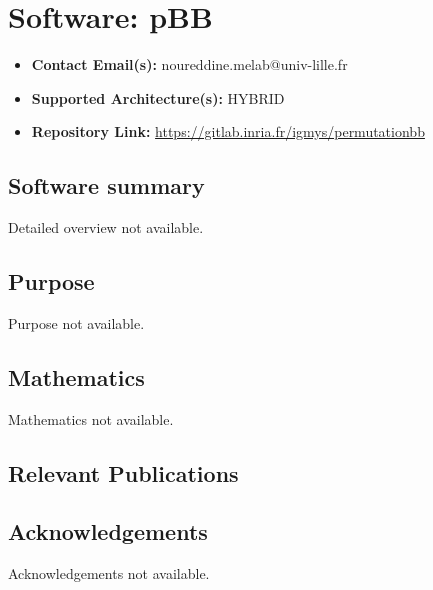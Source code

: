 \section{Software: pBB}
\label{sec:pBB:software}



\begin{itemize}
    \item \textbf{Contact Email(s):} noureddine.melab@univ-lille.fr
    \item \textbf{Supported Architecture(s):} HYBRID
    \item \textbf{Repository Link:} \href{https://gitlab.inria.fr/igmys/permutationbb}{https://gitlab.inria.fr/igmys/permutationbb}
\end{itemize}

\subsection{Software summary}
\label{sec:pBB:summary}
Detailed overview not available.



\subsection{Purpose}
\label{sec:pBB:purpose}
Purpose not available.



\subsection{Mathematics}
\label{sec:pBB:mathematics}
Mathematics not available.


\subsection{Relevant Publications}
\label{sec:pBB:publications}

\subsection{Acknowledgements}
\label{sec::pBB:acknowledgements}

Acknowledgements not available.


